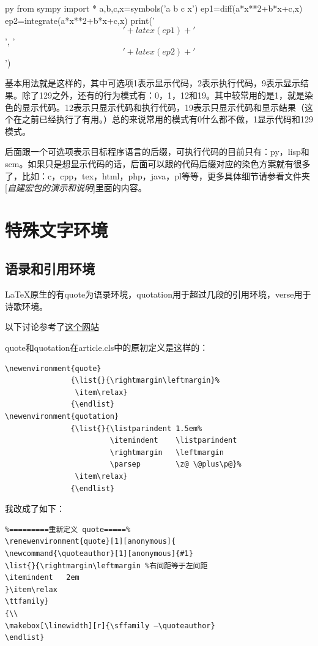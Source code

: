 \documentclass[12pt,oneside]{book}
\begin{document}
\begin{common-format}
\begin{xverbatim}[129]{py}
from sympy import *
a,b,c,x=symbols('a b c x') 
ep1=diff(a*x**2+b*x+c,x)
ep2=integrate(a*x**2+b*x+c,x)
print('$$' + latex(ep1) + '$$', '$$' + latex(ep2) + '$$')
\end{xverbatim}

基本用法就是这样的，其中可选项1表示显示代码，2表示执行代码，9表示显示结果。除了129之外，还有的行为模式有：0，1，12和19。其中较常用的是1，就是染色的显示代码。12表示只显示代码和执行代码，19表示只显示代码和显示结果（这个在之前已经执行了有用。）总的来说常用的模式有0什么都不做，1显示代码和129模式。

后面跟一个可选项表示目标程序语言的后缀，可执行代码的目前只有：py，lisp和scm。如果只是想显示代码的话，后面可以跟的代码后缀对应的染色方案就有很多了，比如：c，cpp，tex，html，php，java，pl等等，更多具体细节请参看文件夹[\textit{自建宏包的演示和说明}]里面的内容。




\section{特殊文字环境}
\subsection{语录和引用环境}
\LaTeX 原生的有quote为语录环境，quotation用于超过几段的引用环境，verse用于诗歌环境。

以下讨论参考了\href{http://tex.stackexchange.com/questions/33219/whats-the-difference-between-the-environments-quote-and-quotation}{这个网站}

quote和quotation在article.cls中的原初定义是这样的：
\begin{Verbatim}
\newenvironment{quote}
               {\list{}{\rightmargin\leftmargin}%
                \item\relax}
               {\endlist}
\newenvironment{quotation}
               {\list{}{\listparindent 1.5em%
                        \itemindent    \listparindent
                        \rightmargin   \leftmargin
                        \parsep        \z@ \@plus\p@}%
                \item\relax}
               {\endlist}
\end{Verbatim}

我改成了如下：
\begin{Verbatim}
%=========重新定义 quote=====%
\renewenvironment{quote}[1][anonymous]{
\newcommand{\quoteauthor}[1][anonymous]{#1}
\list{}{\rightmargin\leftmargin %右间距等于左间距
\itemindent   2em
}\item\relax
\ttfamily}
{\\
\makebox[\linewidth][r]{\sffamily —\quoteauthor}
\endlist}


\end{Verbatim}
\end{common-format}
\end{document}
